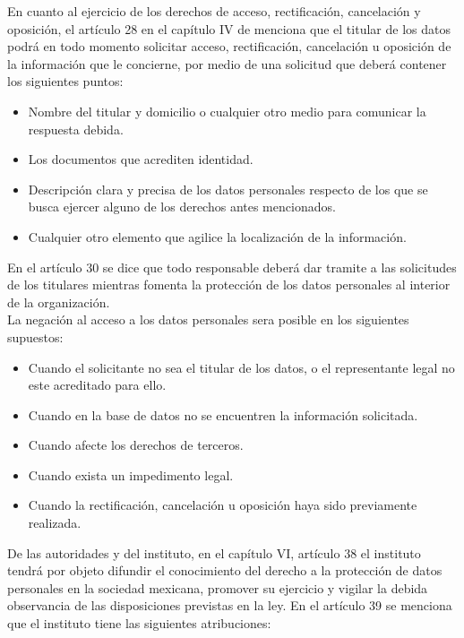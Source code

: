 \documentclass[runningheads,a4paper]{llncs}
\begin{document}
En cuanto al ejercicio de los derechos de acceso, rectificación, cancelación y oposición, el artículo 28 en el capítulo IV de \cite{LFPDPPP_1} menciona que el titular de los datos podrá en todo momento solicitar acceso, rectificación, cancelación u oposición de la información que le concierne, por medio de una solicitud que deberá contener los siguientes puntos:

\begin{itemize}
	\item Nombre del titular y domicilio o cualquier otro medio para comunicar la respuesta debida.
	\item Los documentos que acrediten identidad.
	\item Descripción clara y precisa de los datos personales respecto de los que se busca ejercer
alguno de los derechos antes mencionados.
	\item Cualquier otro elemento que agilice la localización de la información. 
\end{itemize}

En el artículo 30 se dice que todo responsable deberá dar tramite a las solicitudes de los titulares mientras fomenta la protección de los datos personales al interior de la organización.\\

La negación al acceso a los datos personales sera posible en los siguientes supuestos:

\begin{itemize}
	\item Cuando el solicitante no sea el titular de los datos, o el representante legal no este acreditado para ello.
	\item Cuando en la base de datos no se encuentren la información solicitada.
	\item Cuando afecte los derechos de terceros.
	\item Cuando exista un impedimento legal.
	\item Cuando la rectificación, cancelación u oposición haya sido previamente realizada.
\end{itemize} 

De las autoridades y del instituto, en el capítulo VI, artículo 38 el instituto tendrá por objeto difundir el conocimiento del derecho a la protección de datos personales en la sociedad mexicana, promover su ejercicio y vigilar la debida observancia de las disposiciones previstas en la ley. En el artículo 39 se menciona que el instituto tiene las siguientes atribuciones:
\end{document}
